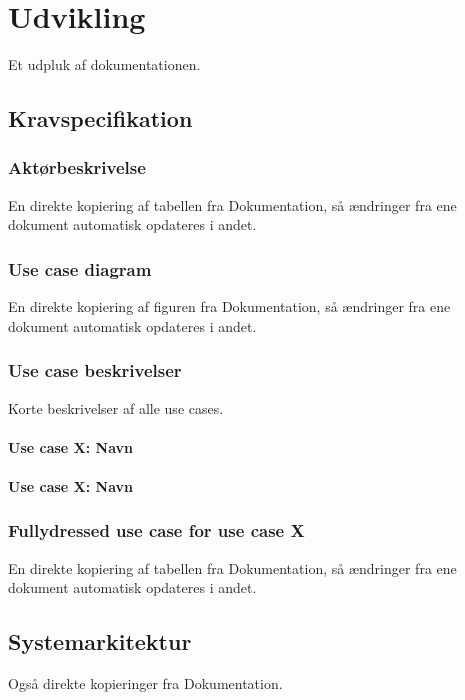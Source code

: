 \chapter{Udvikling}\label{kapitel_Udvikling}

Et udpluk af dokumentationen.

\section{Kravspecifikation}


\subsection{Aktørbeskrivelse}
En direkte kopiering af tabellen fra Dokumentation, så ændringer fra ene dokument automatisk opdateres i andet.

\subsection{Use case diagram}
En direkte kopiering af figuren fra Dokumentation, så ændringer fra ene dokument automatisk opdateres i andet.

\subsection{Use case beskrivelser}

Korte beskrivelser af alle use cases.

\subsubsection{Use case X: Navn}


\subsubsection{Use case X: Navn} 

\subsection{Fullydressed use case for use case X}
En direkte kopiering af tabellen fra Dokumentation, så ændringer fra ene dokument automatisk opdateres i andet.


\section{Systemarkitektur}
Også direkte kopieringer fra Dokumentation.


